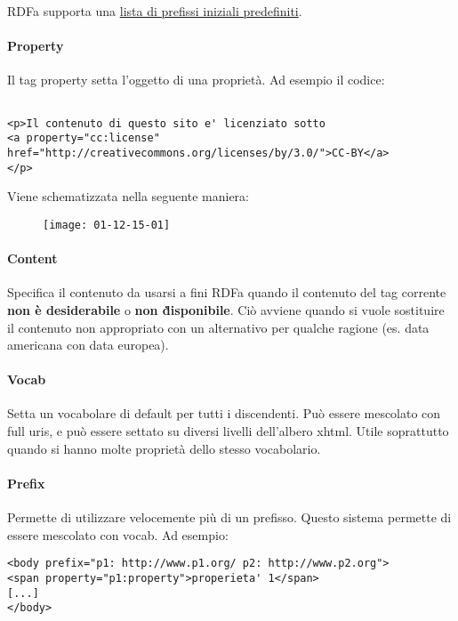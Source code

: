 RDFa supporta una \href{http.//www.w3.org/2011/rdfa-context/rdfa-1}{lista di prefissi iniziali predefiniti}.

\newpage

\paragraph*{Property}Il tag property setta l'oggetto di una propriet\`a. Ad esempio il codice:
\begin{verbatim}

<p>Il contenuto di questo sito e' licenziato sotto
<a property="cc:license" 
href="http://creativecommons.org/licenses/by/3.0/">CC-BY</a>
</p>
\end{verbatim}

Viene schematizzata nella seguente maniera:

\begin{figure}[h]
  \centering
  \texttt{[image: 01-12-15-01]}
\end{figure}

\paragraph*{Content}Specifica il contenuto da usarsi a fini RDFa quando il contenuto del tag corrente \textbf{non \`e desiderabile} o \textbf{non \` disponibile}. Ci\`o avviene quando si vuole sostituire il contenuto non appropriato con un alternativo per qualche ragione (es. data americana con data europea).

\paragraph*{Vocab}Setta un vocabolare di default per tutti i discendenti. Pu\`o essere mescolato con full uris, e pu\`o essere settato su diversi livelli dell'albero xhtml. Utile soprattutto quando si hanno molte propriet\`a dello stesso vocabolario.

\paragraph*{Prefix}Permette di utilizzare velocemente pi\`u di un prefisso. Questo sistema permette di essere mescolato con vocab.
Ad esempio:
\begin{verbatim}
<body prefix="p1: http://www.p1.org/ p2: http://www.p2.org">
<span property="p1:property">properieta' 1</span>
[...]
</body>
\end{verbatim}

